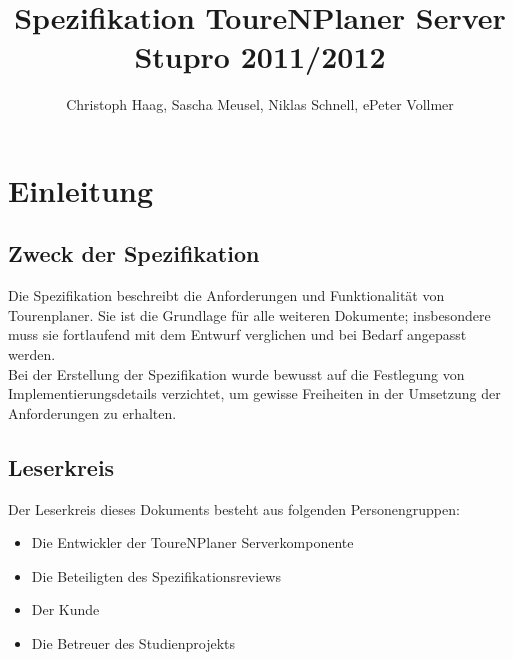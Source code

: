 \documentclass[a4paper,10pt,titlepage]{article}
\author{Christoph Haag, Sascha Meusel, Niklas Schnell, ePeter Vollmer}
\title{Spezifikation ToureNPlaner Server\\ Stupro 2011/2012}
\begin{document}
\maketitle
{}
\setcounter{page}{1}
\tableofcontents
\clearpage
{}
\setcounter{page}{1}

\section{Einleitung}
\subsection{Zweck der Spezifikation}
Die Spezifikation beschreibt die Anforderungen und Funktionalität von Tourenplaner. Sie ist die Grundlage für alle weiteren Dokumente; insbesondere muss sie fortlaufend mit dem Entwurf verglichen und bei Bedarf angepasst werden.\\
Bei der Erstellung der Spezifikation wurde bewusst auf die Festlegung von Implementierungsdetails verzichtet, um gewisse Freiheiten in der Umsetzung der Anforderungen zu erhalten.

\subsection{Leserkreis}
Der Leserkreis dieses Dokuments besteht aus folgenden Personengruppen:
\begin{itemize}
\item Die Entwickler der ToureNPlaner Serverkomponente
\item Die Beteiligten des Spezifikationsreviews
\item Der Kunde
\item Die Betreuer des Studienprojekts
\end{itemize}
\end{document}
